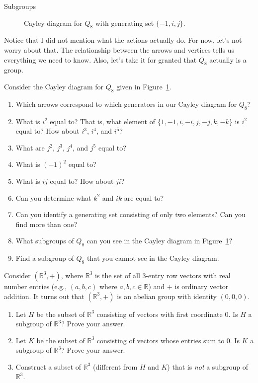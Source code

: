\begin{section}{Subgroups}
\begin{figure}[!ht]
\begin{tikzpicture}[scale=1.5,auto]
\end{tikzpicture}
\caption{Cayley diagram for $Q_8$ with generating set $\{-1, i, j\}$.}\label{fig:Q8}
\end{figure}

Notice that I did not mention what the actions actually do.  For now, let's not worry about that.  The relationship between the arrows and vertices tells us everything we need to know.  Also, let's take it for granted that $Q_8$ actually is a group.

\begin{problem}
Consider the Cayley diagram for $Q_8$ given in Figure~\ref{fig:Q8}.
\begin{enumerate}[label=\textrm{(\alph*)}]
\item Which arrows correspond to which generators in our Cayley diagram for $Q_8$?
\item What is $i^2$ equal to?  That is, what element of $\{1,-1,i,-i,j,-j,k,-k\}$ is $i^2$ equal to?  How about $i^3$, $i^4$, and $i^5$?
\item What are $j^2$, $j^3$, $j^4$, and $j^5$ equal to?
\item What is $(-1)^2$ equal to?
\item What is $ij$ equal to?  How about $ji$?
\item Can you determine what $k^2$ and $ik$ are equal to?
\item Can you identify a generating set consisting of only two elements?  Can you find more than one?
\item What subgroups of $Q_8$ can you see in the Cayley diagram in Figure~\ref{fig:Q8}?
\item Find a subgroup of $Q_8$ that you cannot see in the Cayley diagram.
\end{enumerate}
\end{problem}

\begin{problem}
Consider $(\mathbb{R}^3,+)$, where $\mathbb{R}^3$ is the set of all 3-entry row vectors with real number entries (e.g., $(a,b,c)$ where $a,b,c\in\mathbb{R}$) and $+$ is ordinary vector addition.  It turns out that $(\mathbb{R}^3,+)$ is an abelian group with identity $(0,0,0)$.  
\begin{enumerate}[label=\textrm{(\alph*)}]
\item Let $H$ be the subset of $\mathbb{R}^3$ consisting of vectors with first coordinate 0.  Is $H$ a subgroup of $\mathbb{R}^3$?  Prove your answer.
\item Let $K$ be the subset of $\mathbb{R}^3$ consisting of vectors whose entries sum to 0.  Is $K$ a subgroup of $\mathbb{R}^3$?  Prove your answer.
\item Construct a subset of $\mathbb{R}^3$ (different from $H$ and $K$) that is \emph{not} a subgroup of $\mathbb{R}^3$.
\end{enumerate}
\end{problem}


\end{section}
